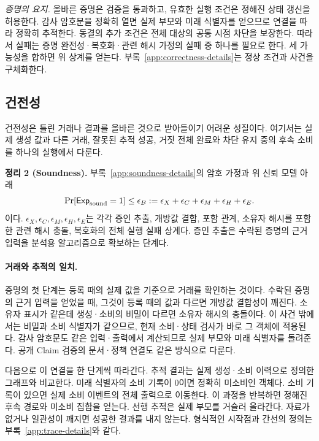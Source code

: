 \emph{증명의 요지.}
올바른 증명은 검증을 통과하고, 유효한 실행 조건은 정해진 상태
갱신을 허용한다. 감사 암호문을 정확히 열면 실제 부모와 미래
식별자를 얻으므로 연결을 따라 정확히 추적한다.
동결의 추가 조건은 전체 대상의 공통 시점 차단을 보장한다.
따라서 실패는 증명 완전성·복호화·관련 해시 가정의 실패 중
하나를 필요로 한다. 세 가능성을 합하면 위 상계를 얻는다.
부록~\ref{app:correctness-details}는 정상 조건과 사건을 구체화한다.

\subsection{건전성}
\label{sec:soundness-proof}
\label{sec:binding-argument}

건전성은 틀린 거래나 결과를 올바른 것으로 받아들이기 어려운 성질이다.
여기서는 실제 생성 값과 다른 거래, 잘못된 추적 성공,
거짓 전체 완료와 차단 유지 중의 후속 소비를 하나의 실행에서 다룬다.

\textbf{정리 2 (Soundness).}
부록~\ref{app:soundness-details}의 암호 가정과 위 신뢰 모델 아래
\begin{equation}
 \Pr[\mathsf{Exp}_{\rm sound}=1]\leq
 \epsilon_B:=\epsilon_X+\epsilon_C+\epsilon_M+\epsilon_H+\epsilon_E.
 \label{eq:bad-binding-bound}
\end{equation}
이다. $\epsilon_X,\epsilon_C,\epsilon_M,\epsilon_H,\epsilon_E$는
각각 증인 추출, 개방값 결합, 포함 관계, 소유자 해시를 포함한 관련 해시 충돌,
복호화의 전체 실행 실패 상계다.
증인 추출은 수락된 증명의 근거 입력을 분석용 알고리즘으로
확보하는 단계다.

\paragraph{거래와 추적의 일치.}
\label{sec:trace-argument}

증명의 첫 단계는 등록 때의 실제 값을 기준으로 거래를 확인하는 것이다.
수락된 증명의 근거 입력을 얻었을 때, 그것이 등록 때의 값과 다르면
개방값 결합성이 깨진다. 소유자 표시가 같은데 생성·소비의 비밀이
다르면 소유자 해시의 충돌이다. 이 사건 밖에서는 비밀과 소비
식별자가 같으므로, 현재 소비·상태 검사가 바로 그 객체에 적용된다.
감사 암호문도 같은 입력·출력에서 계산되므로 실제 부모와 미래
식별자를 돌려준다. 공개 Claim 검증의 문서·정책 연결도 같은 방식으로 다룬다.

다음으로 이 연결을 한 단계씩 따라간다.
추적 결과는 실제 생성·소비 이력으로 정의한 그래프와 비교한다.
미래 식별자의 소비 기록이 0이면 정확히 미소비인 객체다.
소비 기록이 있으면 실제 소비 이벤트의 전체 출력으로 이동한다.
이 과정을 반복하면 정해진 후속 경로와 미소비 집합을 얻는다.
선행 추적은 실제 부모를 거슬러 올라간다.
자료가 없거나 일관성이 깨지면 성공한 결과를 내지 않는다.
형식적인 시작점과 간선의 정의는 부록~\ref{app:trace-details}와 같다.

